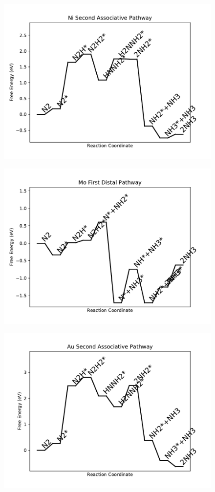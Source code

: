 \begin{figure}
\includegraphics[width=0.8\linewidth]{data/plots/Ni_associative_2.pdf}
\end{figure}

\begin{figure}
\includegraphics[width=0.8\linewidth]{data/plots/Mo_distal_1.pdf}
\end{figure}

\begin{figure}
\includegraphics[width=0.8\linewidth]{data/plots/Au_associative_2.pdf}
\end{figure}

